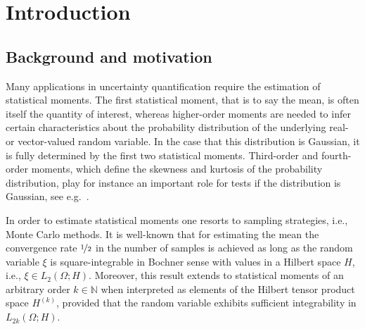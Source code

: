 \documentclass[reqno]{amsart}
\numberwithin{equation}{section}
\newcommand{\bbN}{\mathbb{N}}
\theoremstyle{remark}
\theoremstyle{definition}
\begin{document}




\date{}

\maketitle

\section{Introduction}\label{section:intro} 

\subsection{Background and motivation}\label{subsec:motivation} 

Many applications in uncertainty quantification 
require the estimation of statistical moments. 
The first statistical moment, 
that is to say the mean, 
is often itself the quantity of interest, 
whereas higher-order moments 
are needed to infer 
certain characteristics about the 
probability distribution of 
the underlying real- or 
vector-valued random variable. 
In the case that this 
distribution is Gaussian, 
it is fully determined by 
the first two statistical moments. 
Third-order and fourth-order 
moments, which define the 
skewness and kurtosis of the probability distribution,  
play for instance an important role 
for tests if 
the distribution is Gaussian, 
see e.g.\ \cite{JarqueBera1987,Mardia1970}. 

In order to estimate statistical moments 
one resorts to sampling strategies, i.e., Monte Carlo methods. 
It is well-known that 
for estimating the mean  
the convergence 
rate $\nicefrac{1}{2}$ in the number of samples 
is achieved as long as 
the random variable $\xi$ is 
square-integrable in Bochner sense 
with values in a Hilbert space $H$, 
i.e., $\xi\in L_2(\Omega;H)$. 
Moreover, this result extends 
to statistical moments of an arbitrary order $k\in\bbN$ 
when interpreted as elements of the 
Hilbert tensor product space $H^{(k)}$\!,  
provided that the random variable 
exhibits sufficient integrability 
in $L_{2k}(\Omega;H)$. 
\end{document}

